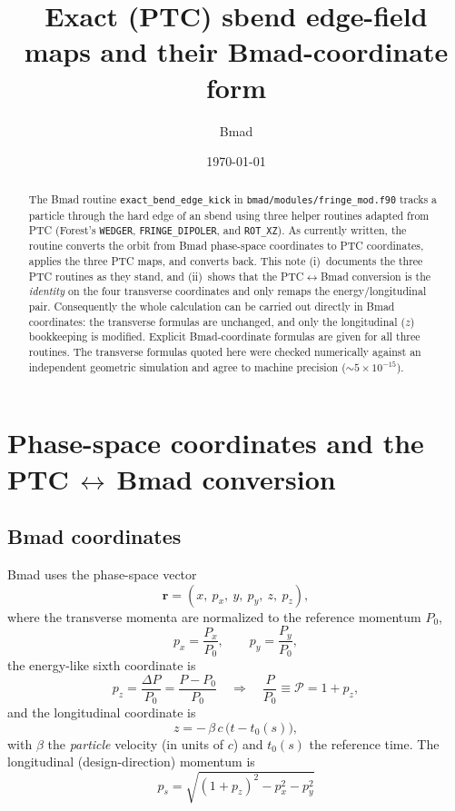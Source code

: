 \documentclass[11pt]{article}
\title{Exact (PTC) sbend edge-field maps and their Bmad-coordinate form}
\author{Bmad}
\date{\today}
\newcommand{\code}[1]{\texttt{#1}}
\newcommand{\Pmag}{\mathcal{P}}          %
\begin{document}
\maketitle

\begin{abstract}
The Bmad routine \code{exact\_bend\_edge\_kick} in
\code{bmad/modules/fringe\_mod.f90} tracks a particle through the hard edge of
an sbend using three helper routines adapted from PTC (Forest's \code{WEDGER},
\code{FRINGE\_DIPOLER}, and \code{ROT\_XZ}). As currently written, the routine
converts the orbit from Bmad phase-space coordinates to PTC coordinates, applies
the three PTC maps, and converts back. This note (i)~documents the three PTC
routines as they stand, and (ii)~shows that the PTC$\leftrightarrow$Bmad
conversion is the \emph{identity} on the four transverse coordinates and only
remaps the energy/longitudinal pair. Consequently the whole calculation can be
carried out directly in Bmad coordinates: the transverse formulas are unchanged,
and only the longitudinal ($z$) bookkeeping is modified. Explicit Bmad-coordinate
formulas are given for all three routines. The transverse formulas quoted here
were checked numerically against an independent geometric simulation and agree to
machine precision ($\sim 5\times 10^{-15}$).
\end{abstract}

\tableofcontents

\section{Phase-space coordinates and the PTC\,$\leftrightarrow$\,Bmad conversion}

\subsection{Bmad coordinates}

Bmad uses the phase-space vector
\begin{equation}
  \mathbf{r} = (x,\ p_x,\ y,\ p_y,\ z,\ p_z),
\end{equation}
where the transverse momenta are normalized to the reference momentum $P_0$,
\begin{equation}
  p_x = \frac{P_x}{P_0}, \qquad p_y = \frac{P_y}{P_0},
\end{equation}
the energy-like sixth coordinate is
\begin{equation}
  p_z = \frac{\Delta P}{P_0} = \frac{P - P_0}{P_0}
  \quad\Longrightarrow\quad
  \frac{P}{P_0} \equiv \Pmag = 1 + p_z,
\end{equation}
and the longitudinal coordinate is
\begin{equation}
  z = -\,\beta\, c\,\bigl(t - t_0(s)\bigr),
\end{equation}
with $\beta$ the \emph{particle} velocity (in units of $c$) and $t_0(s)$ the
reference time. The longitudinal (design-direction) momentum is
\begin{equation}
  \boxed{\;p_s = \sqrt{(1+p_z)^2 - p_x^2 - p_y^2}\;}
  \label{eq:ps}
\end{equation}
\end{document}
